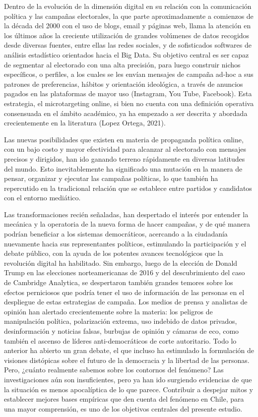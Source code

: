 \documentclass[
  10pt,
  letterpaper,
]{report}
\begin{document}
Dentro de la evolución de la dimensión digital en su relación con la
comunicación política y las campañas electorales, la que parte
aproximadamente a comienzos de la década del 2000 con el uso de blogs,
email y páginas web, llama la atención en los últimos años la creciente
utilización de grandes volúmenes de datos recogidos desde diversas
fuentes, entre ellas las redes sociales, y de sofisticados softwares de
análisis estadístico orientados hacia el Big Data. Su objetivo central
es ser capaz de segmentar al electorado con una alta precisión, para
luego construir nichos específicos, o perfiles, a los cuales se les
envían mensajes de campaña ad-hoc a sus patrones de preferencias,
hábitos y orientación ideológica, a través de anuncios pagados en las
plataformas de mayor uso (Instagram, You Tube, Facebook). Esta
estrategia, el microtargeting online, si bien no cuenta con una
definición operativa consensuada en el ámbito académico, ya ha empezado
a ser descrita y abordada crecientemente en la literatura (Lopez Ortega,
2021).

Las nuevas posibilidades que existen en materia de propaganda política
online, con un bajo costo y mayor efectividad para alcanzar al
electorado con mensajes precisos y dirigidos, han ido ganando terreno
rápidamente en diversas latitudes del mundo. Esto inevitablemente ha
significado una mutación en la manera de pensar, organizar y ejecutar
las campañas políticas, lo que también ha repercutido en la tradicional
relación que se establece entre partidos y candidatos con el entorno
mediático.

Las transformaciones recién señaladas, han despertado el interés por
entender la mecánica y la operatoria de la nueva forma de hacer
campañas, y de qué manera podrían beneficiar a los sistemas
democráticos, acercando a la ciudadanía nuevamente hacia sus
representantes políticos, estimulando la participación y el debate
público, con la ayuda de los potentes avances tecnológicos que la
revolución digital ha habilitado. Sin embargo, luego de la elección de
Donald Trump en las elecciones norteamericanas de 2016 y del
descubrimiento del caso de Cambridge Analytica, se despertaron también
grandes temores sobre los efectos perniciosos que podría tener el uso de
información de las personas en el despliegue de estas estrategias de
campaña. Los medios de prensa y analistas de opinión han alertado
crecientemente sobre la materia: los peligros de manipulación política,
polarización extrema, uso indebido de datos privados, desinformación y
noticias falsas, burbujas de opinión y cámaras de eco, como también el
ascenso de líderes anti-democráticos de corte autoritario. Todo lo
anterior ha abierto un gran debate, el que incluso ha estimulado la
formulación de visiones distópicas sobre el futuro de la democracia y la
libertad de las personas. Pero, ¿cuánto realmente sabemos sobre los
contornos del fenómeno? Las investigaciones aún son insuficientes, pero
ya han ido surgiendo evidencias de que la situación es menos
apocalíptica de lo que parece. Contribuir a despejar mitos y establecer
mejores bases empíricas que den cuenta del fenómeno en Chile, para una
mayor comprensión, es uno de los objetivos centrales del presente
estudio.
\end{document}
